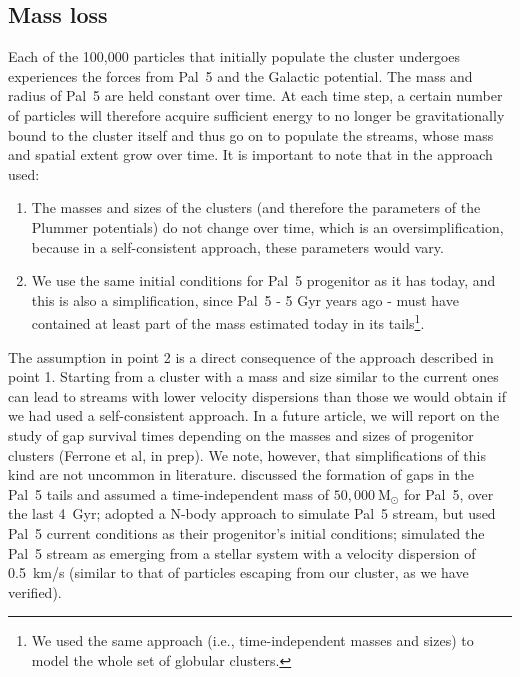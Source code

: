 \documentclass{aa}
\begin{document}
\subsection{Mass loss}\label{sec:mass_loss}

Each of the 100,000 particles that initially populate the cluster undergoes experiences the forces from Pal~5 and the Galactic potential. The mass and radius of Pal~5 are held constant over time. At each time step, a certain number of particles will therefore acquire sufficient energy to no longer be gravitationally bound to the cluster itself and thus go on to populate the streams, whose mass and spatial extent grow over time. It is important to note that in the approach used:

\begin{enumerate}
    \item The masses and sizes of the clusters (and therefore the parameters of the Plummer potentials) do not change over time, which is an oversimplification, because in a self-consistent approach, these parameters would vary. 
    \item We use the same initial conditions for Pal~5 progenitor as it has today, and this is also a simplification, since Pal~5 - 5 Gyr years ago - must have contained at least part of the mass estimated today in its tails\footnote{We used the same approach (i.e., time-independent masses and sizes) to model the whole set of globular clusters.}. 
\end{enumerate}

The assumption in point 2 is a direct consequence of the approach described in point 1. Starting from a cluster with a mass and size similar to the current ones can lead to streams with lower velocity dispersions than those we would obtain if we had used a self-consistent approach. In a future article, we will report on the study of gap survival times depending on the masses and sizes of progenitor clusters (Ferrone et al, in prep). We note, however, that simplifications of this kind are not uncommon in literature. \citet{2017NatAs...1..633P} discussed the formation of gaps in the Pal~5 tails and assumed a time-independent mass of $50,000 ~\textrm{M}_\odot$ for Pal~5, over the last 4~Gyr; \citet{2017MNRAS.470...60E} adopted a N-body approach to simulate Pal~5 stream, but used Pal~5 current conditions as their progenitor's initial conditions; \citet{2019MNRAS.484.2009B} simulated the Pal~5 stream as emerging from a stellar system with a velocity dispersion of 0.5~km/s (similar to that of particles escaping from our cluster, as we have verified). 
\end{document}
